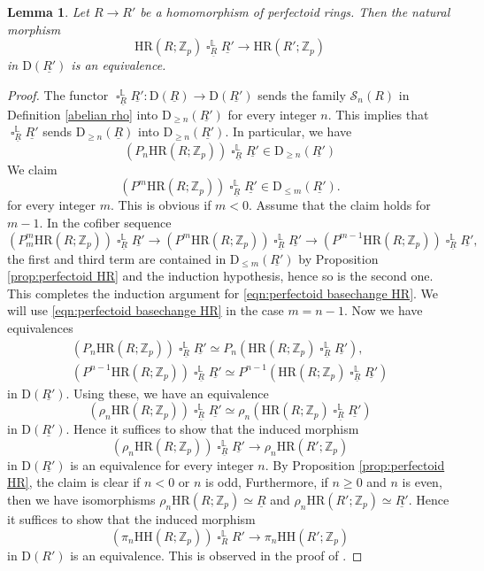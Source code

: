 \documentclass[10pt]{amsart}
\newtheorem{lem}[thm]{Lemma}
\theoremstyle{definition}
\numberwithin{equation}{section}
\renewcommand{\L}{\mathbb{L}}
\newcommand{\Z}{\mathbb{Z}}
\newcommand{\cS}{\mathcal{S}}
\newcommand{\rD}{\mathrm{D}}
\newcommand{\ul}{\underline}
\DeclareMathOperator{\sotimes}{\square}
\newcommand{\HH}{\mathrm{HH}}
\newcommand{\HR}{\mathrm{HR}}
\begin{document}
\begin{lem}
\label{perfectoid basechange HR}
Let $R\to R'$ be a homomorphism of perfectoid rings.
Then the natural morphism
\[
\HR(R;\Z_p)
\sotimes_{\ul{R}}^\L
\ul{R'}
\to
\HR(R';\Z_p)
\]
in $\rD(\ul{R'})$ is an equivalence.
\end{lem}
\begin{proof}
The functor $\sotimes_{\ul{R}}^\L \ul{R'}\colon \rD(\ul{R})\to \rD(\ul{R'})$ sends the family $\cS_n(R)$ in Definition \ref{abelian rho} into $\rD_{\geq n}(\ul{R'})$ for every integer $n$.
This implies that $\sotimes_{\ul{R}}^\L \ul{R'}$ sends $\rD_{\geq n}(\ul{R})$ into $\rD_{\geq n}(\ul{R'})$.
In particular,
we have
\[
(P_n \HR(R;\Z_p))\sotimes_{\ul{R}}^\L \ul{R'}
\in
\rD_{\geq n}(\ul{R'})
\]
We claim
\begin{equation}
\label{eqn:perfectoid basechange HR}
(P^{m} \HR(R;\Z_p))\sotimes_{\ul{R}}^\L \ul{R'}
\in
\rD_{\leq m}(\ul{R'}).
\end{equation}
for every integer $m$.
This is obvious if $m<0$.
Assume that the claim holds for $m-1$.
In the cofiber sequence
\[
(P_m^m \HR(R;\Z_p))\sotimes_{\ul{R}}^\L \ul{R'}
\to
(P^m \HR(R;\Z_p))\sotimes_{\ul{R}}^\L \ul{R'}
\to
(P^{m-1} \HR(R;\Z_p))\sotimes_{\ul{R}}^\L \ul{R'},
\]
the first and third term are contained in $\rD_{\leq m}(\ul{R'})$ by Proposition \ref{prop:perfectoid HR} and the induction hypothesis, hence so is the second one.
This completes the induction argument for \eqref{eqn:perfectoid basechange HR}.
We will use \eqref{eqn:perfectoid basechange HR} in the case $m=n-1$.
Now we have equivalences
\begin{gather*}
(P_n \HR(R;\Z_p))\sotimes_{\ul{R}}^\L \ul{R'}
\simeq
P_n(\HR(R;\Z_p)\sotimes_{\ul{R}}^\L \ul{R'}),
\\
(P^{n-1} \HR(R;\Z_p))\sotimes_{\ul{R}}^\L \ul{R'}
\simeq
P^{n-1} (\HR(R;\Z_p)\sotimes_{\ul{R}}^\L \ul{R'})
\end{gather*}
in $\rD(\ul{R'})$.
Using these,
we have an equivalence
\[
(\rho_n \HR(R;\Z_p))\sotimes_{\ul{R}}^\L \ul{R'}
\simeq
\rho_n(\HR(R;\Z_p)\sotimes_{\ul{R}}^\L \ul{R'})
\]
in $\rD(\ul{R'})$.
Hence it suffices to show that the induced morphism
\[
(\rho_n\HR(R;\Z_p))
\sotimes_{\ul{R}}^\L \ul{R'}
\to
\rho_n\HR(R';\Z_p)
\]
in $\rD(\ul{R'})$ is an equivalence for every integer $n$.
By Proposition \ref{prop:perfectoid HR},
the claim is clear if $n<0$ or $n$ is odd,
Furthermore,
if $n\geq 0$ and $n$ is even,
then we have isomorphisms $\rho_n\HR(R;\Z_p)\simeq \ul{R}$ and $\rho_n\HR(R';\Z_p)\simeq \ul{R'}$.
Hence it suffices to show that the induced morphism
\[
(\pi_n\HH(R;\Z_p))
\sotimes_{R}^\L R'
\to
\pi_n\HH(R';\Z_p)
\]
in $\rD(R')$ is an equivalence.
This is observed in the proof of \cite[Theorem 6.1]{BMS19}.
\end{proof}
\end{document}
